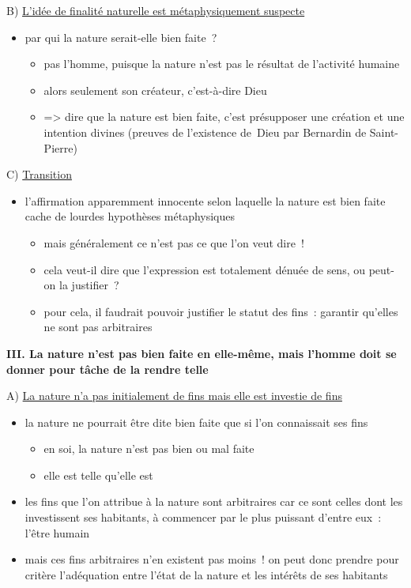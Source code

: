 \documentclass[a4paper,12pt]{report}
\begin{document}
\medskip

B) \uline{L'idée de finalité naturelle est métaphysiquement suspecte} 
\begin{itemize}
\item par qui la nature serait-elle bien faite ?
\begin{itemize}
\item pas l'homme, puisque la nature n'est pas le résultat de l'activité
humaine
\item alors seulement son créateur, c'est-à-dire Dieu
\item => dire que la nature est bien faite, c'est présupposer une création
et une intention divines (preuves de l'existence de Dieu par
Bernardin de Saint-Pierre)
\end{itemize}
\end{itemize}

\medskip

C) \uline{Transition}
\begin{itemize}
\item l'affirmation apparemment innocente selon laquelle la nature est bien
faite cache de lourdes hypothèses métaphysiques
\begin{itemize}
\item mais généralement ce n'est pas ce que l'on veut dire !
\item cela veut-il dire que l'expression est totalement dénuée de sens, ou
peut-on la justifier ?
\item pour cela, il faudrait pouvoir justifier le statut des fins :
garantir qu'elles ne sont pas arbitraires
\end{itemize}
\end{itemize}

\bigskip


\textbf{III. La nature n'est pas bien faite en elle-même, mais l'homme doit se
donner pour tâche de la rendre telle}

\medskip

A) \uline{La nature n'a pas initialement de fins mais elle est investie de fins} 
\begin{itemize}
\item la nature ne pourrait être dite bien faite que si l'on connaissait ses
fins
\begin{itemize}
\item en soi, la nature n'est pas bien ou mal faite
\item elle est telle qu'elle est
\end{itemize}
\item les fins que l'on attribue à la nature sont arbitraires car ce sont
celles dont les investissent ses habitants, à commencer par le plus
puissant d'entre eux : l'être humain
\item mais ces fins arbitraires n'en existent pas moins ! on peut donc
prendre pour critère l'adéquation entre l'état de la nature et les
intérêts de ses habitants
\end{itemize}
\end{document}
